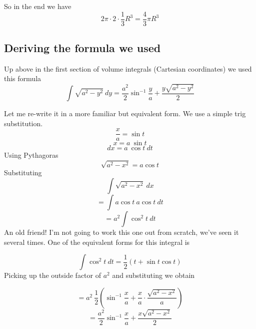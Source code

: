 \documentclass[11pt, oneside]{article}
\begin{document}
So in the end we have 
\[ 2 \pi \cdot 2 \cdot \frac{1}{3}R^3 = \frac{4}{3} \pi R^3 \]

\subsection*{Deriving the formula we used}
Up above in the first section of volume integrals (Cartesian coordinates) we used this formula
\[ \int \sqrt{a^2 - y^2} \ dy = \frac{a^2}{2} \sin^{-1} \frac{y}{a} + \frac{y \sqrt{a^2-y^2}}{2} \]

Let me re-write it in a more familiar but equivalent form.  We use a simple trig substitution.
\[ \frac{x}{a} = \sin t \]
\[ x = a \ \sin t \]
\[ dx = a \ \cos t \ dt \]
Using Pythagoras
\[ \sqrt{a^2 - x^2} = a \cos t \]
Substituting
\[ \int \sqrt{a^2 - x^2} \ dx \]
\[ = \int  a \cos t \ a \cos t \ dt \] 
\[ = a^2 \int  \cos^2 t \ dt \]
An old friend!  I'm not going to work this one out from scratch, we've seen it several times.  One of the equivalent forms for this integral is

\[ \int \cos^2 t \ dt = \frac{1}{2}(t + \sin t \cos t) \]
Picking up the outside factor of $a^2$ and substituting we obtain

\[ = a^2 \ \frac{1}{2} (\sin^{-1}\frac{x}{a} + \frac{x}{a} \cdot \frac{\sqrt{a^2-x^2}}{a} ) \]
\[ = \frac{a^2}{2} \sin^{-1} \frac{x}{a} + \frac{x \sqrt{a^2-x^2}}{2} \]
\end{document}
